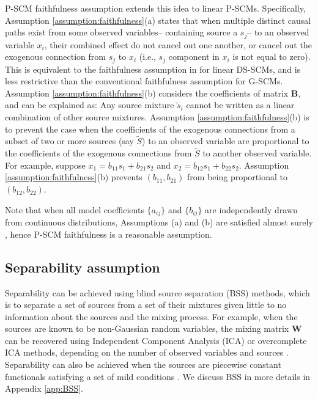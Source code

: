 \documentclass[12pt]{article}
\newcommand{\bB}{\mathbf{B}}
\newcommand{\bW}{\mathbf{W}}
\begin{document}
P-SCM faithfulness assumption extends this idea to linear P-SCMs. Specifically, Assumption \ref{assumption:faithfulness}(a) states that when multiple distinct causal paths exist from some observed variables-- containing source a $s_j$-- to an observed variable $x_i$, their combined effect do not cancel out one another, or cancel out the exogenous connection from $s_j$ to $x_i$ (i.e., $s_j$ component in $x_i$ is not equal to zero).
This is equivalent to the faithfulness assumption in \citep{salehkaleybar2020learning} for linear DS-SCMs, and is less restrictive than the conventional faithfulness assumption for G-SCMs.
%
Assumption \ref{assumption:faithfulness}(b) considers the coefficients of matrix $\bB$, and can be explained as: Any source mixture $\tilde{s}_i$ cannot be written as a linear combination of other source mixtures. Assumption \ref{assumption:faithfulness}(b) is to prevent the case when the coefficients of the exogenous connections from a subset of two or more sources (say $\tilde{S}$) to an observed variable are proportional to the coefficients of the exogenous connections from $\tilde{S}$ to another observed variable. For example, suppose $x_1=b_{11}s_1 + b_{21}s_2$ and $x_2=b_{12}s_1 + b_{22}s_2$. Assumption \ref{assumption:faithfulness}(b) prevents $(b_{11}, b_{21})$ from being proportional to $(b_{12}, b_{22})$.

Note that when all model coefficients $\{a_{ij}\}$ and $\{b_{ij}\}$ are independently drawn from continuous distributions, Assumptions (a) and (b) are satisfied almost surely \citep{meek2013strong}, hence P-SCM faithfulness is a reasonable assumption.

\subsection{Separability assumption}
Separability can be achieved using blind source separation (BSS) methods, which is to separate a set of sources from a set of their mixtures given little to no information about the sources and the mixing process. For example, when the sources are known to be non-Gaussian random variables, the mixing matrix $\bW$ can be recovered using Independent Component Analysis (ICA) or overcomplete ICA methods, {depending on the number of observed variables and sources} \citep{comon1994independent, hyvarinen2002independent, lewicki2000learning,eriksson2004identifiability}. Separability can also be achieved when the sources are piecewise constant functionals satisfying a set of mild conditions \citep{behr2018multiscale}. We discuss BSS in more details in Appendix \ref{app:BSS}.
\end{document}
